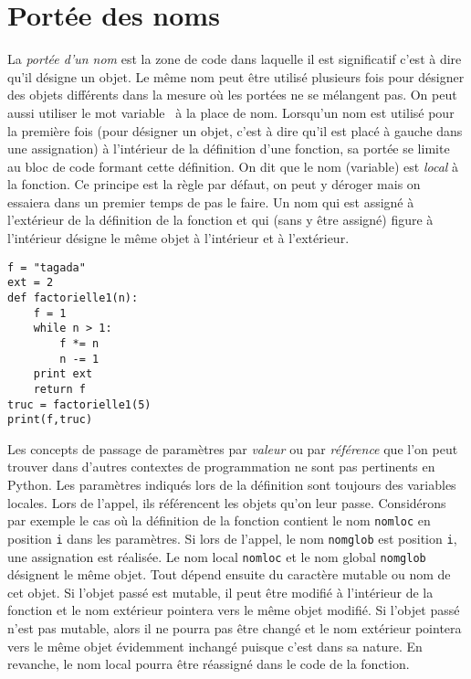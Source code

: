 \section{Portée des noms}
La \emph{portée d'un nom} est la zone de code dans laquelle il est significatif c'est à dire qu'il désigne un objet. Le même nom peut être utilisé plusieurs fois pour désigner des objets différents dans la mesure où les portées ne se mélangent pas.
On peut aussi utiliser le mot \og variable\fg~ à la place de \og nom\fg.\newline 
Lorsqu'un nom est utilisé pour la première fois (pour désigner un objet, c'est à dire qu'il est placé à gauche dans une assignation) à l'intérieur de la définition d'une fonction, sa portée se limite au bloc de code formant cette définition. On dit que le nom (variable) est \emph{local} à la fonction. Ce principe est la règle par défaut, on peut y déroger mais on essaiera dans un premier temps de pas le faire.\newline
Un nom qui est assigné à l'extérieur de la définition de la fonction et qui (sans y être assigné) figure à l'intérieur désigne le même objet à l'intérieur et à l'extérieur.
\begin{verbatim}
f = "tagada"
ext = 2
def factorielle1(n):
    f = 1
    while n > 1:
        f *= n
        n -= 1
    print ext
    return f 
truc = factorielle1(5)
print(f,truc) 
\end{verbatim}
Les concepts de passage de paramètres par \emph{valeur} ou par \emph{référence} que l'on peut trouver dans d'autres contextes de programmation ne sont pas pertinents en Python.\newline
Les paramètres indiqués lors de la définition sont toujours des variables locales. Lors de l'appel, ils référencent les objets qu'on leur passe.\newline
Considérons par exemple le cas où la définition de la fonction contient le nom \texttt{nomloc} en position \texttt{i} dans les paramètres. Si lors de l'appel, le nom \texttt{nomglob} est position \texttt{i}, une assignation est réalisée. Le nom local \texttt{nomloc} et le nom global \texttt{nomglob} désignent le même objet.\newline
Tout dépend ensuite du caractère mutable ou nom de cet objet.\newline
Si l'objet passé est mutable, il peut être modifié à l'intérieur de la fonction et le nom extérieur pointera vers le même objet modifié. Si l'objet passé n'est pas mutable, alors il ne pourra pas être changé et le nom extérieur pointera vers le même objet évidemment inchangé puisque c'est dans sa nature. En revanche, le nom local pourra être réassigné dans le code de la fonction. 

